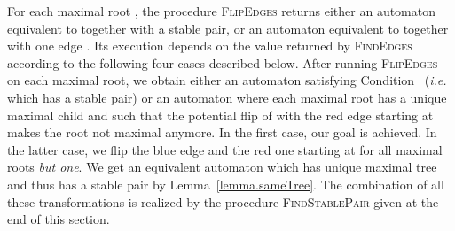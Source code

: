 \documentclass[11pt,a4paper]{article}
\newcommand{\ie}{{\itshape i.e.}\xspace }
\begin{document}
For each maximal root , the procedure \textsc{FlipEdges}
returns either an automaton equivalent to  together with a stable
pair, or an automaton equivalent to  together with one edge
.  Its execution depends on the value returned by
\textsc{FindEdges} according to the following four cases
described below. After running \textsc{FlipEdges} on each
maximal root, we obtain either an automaton satisfying Condition~
(\ie which has a stable pair) or an automaton where each maximal root
 has a unique maximal child and such that the potential flip of
 with the red edge starting at  makes the root 
not maximal anymore. In the first case, our goal is achieved. In the
latter case, we flip the blue edge  and the red one
starting at  for all maximal roots  \emph{but one}. We get an
equivalent automaton which has unique maximal tree and thus has a
stable pair by Lemma~\ref{lemma.sameTree}. The combination of all
these transformations is realized by the procedure
\textsc{FindStablePair} given at the end of this section.
\end{document}
